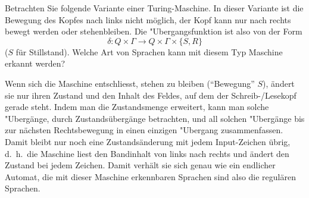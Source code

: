 Betrachten Sie folgende Variante einer Turing-Maschine. In dieser
Variante ist die Bewegung des Kopfes nach links nicht möglich,
der Kopf kann nur nach rechts bewegt werden oder stehenbleiben. Die
"Ubergangsfunktion ist also von der Form
$$\delta:Q\times \Gamma\to Q\times\Gamma\times \{S,R\}$$
($S$ für Stillstand). Welche Art von Sprachen kann mit diesem
Typ Maschine erkannt werden?


\begin{loesung}
Wenn sich die Maschine entschliesst, stehen zu bleiben (``Bewegung'' $S$),
ändert sie
nur ihren Zustand und den Inhalt des Feldes, auf dem der Schreib-/Lesekopf
gerade steht. Indem man die Zustandsmenge erweitert, kann man solche
"Ubergänge, durch Zustandsübergänge betrachten, und all solchen "Ubergänge
bis zur nächsten Rechtsbewegung in einen einzigen "Ubergang zusammenfassen.
Damit bleibt nur noch eine Zustandsänderung mit jedem Input-Zeichen
übrig, d.~h.~die Maschine liest den Bandinhalt von links nach rechts und
ändert den Zustand bei jedem Zeichen. Damit verhält sie sich genau
wie ein endlicher Automat, die mit dieser Maschine erkennbaren Sprachen
sind also die regulären Sprachen.
\end{loesung}
